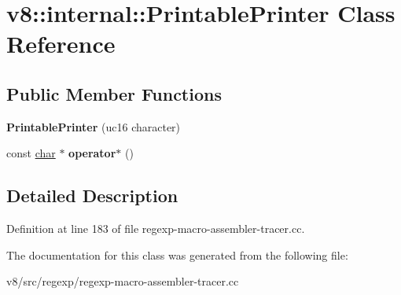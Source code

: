 \hypertarget{classv8_1_1internal_1_1PrintablePrinter}{}\section{v8\+:\+:internal\+:\+:Printable\+Printer Class Reference}
\label{classv8_1_1internal_1_1PrintablePrinter}
\subsection*{Public Member Functions}
\begin{DoxyCompactItemize}
\item 
\mbox{\label{classv8_1_1internal_1_1PrintablePrinter_a7b46fedda0d89f439869b2e2f7358ded}} 
{\bfseries Printable\+Printer} (uc16 character)
\item 
\mbox{\label{classv8_1_1internal_1_1PrintablePrinter_a07570a64d144f3b2ec80c07ee23ed3c5}} 
const \mbox{\hyperlink{classchar}{char}} $\ast$ {\bfseries operator$\ast$} ()
\end{DoxyCompactItemize}


\subsection{Detailed Description}


Definition at line 183 of file regexp-\/macro-\/assembler-\/tracer.\+cc.



The documentation for this class was generated from the following file\+:\begin{DoxyCompactItemize}
\item 
v8/src/regexp/regexp-\/macro-\/assembler-\/tracer.\+cc\end{DoxyCompactItemize}
